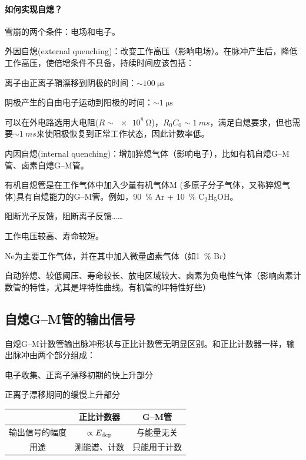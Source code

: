 \paragraph{如何实现自熄？}雪崩的两个条件：电场和电子。

外因自熄(external quenching)：改变工作高压（影响电场）。在脉冲产生后，降低工作高压，使倍增条件不具备，持续时间应该包括：
\begin{compactitem}
	\item 离子由正离子鞘漂移到阴极的时间：$\sim \qty{100}{\micro\second}$
	\item 阴极产生的自由电子运动到阳极的时间：$\sim \qty{1}{\micro\second}$
\end{compactitem}
可以在外电路选用大电阻($R \sim \qty{e8}{\ohm}$)，$R_0C_0 \sim \qty{1}{ms}$，满足自熄要求，但也需要$\sim \qty{1}{ms}$来使阳极恢复到正常工作状态，因此计数率低。

内因自熄(internal quenching)：增加猝熄气体（影响电子），比如有机自熄G--M管、卤素自熄G--M管。


有机自熄管是在工作气体中加入少量有机气体M (多原子分子气体，又称猝熄气体)具有自熄能力的G--M管。例如，\qty{90}{\percent} Ar + \qty{10}{\percent} C$_2$H$_5$OH。

阻断光子反馈，阻断离子反馈……

工作电压较高、寿命较短。


Ne为主要工作气体，并在其中加入微量卤素气体（如\qty{1}{\percent} Br）

自动猝熄、较低阈压、寿命较长、放电区域较大、卤素为负电性气体（影响卤素计数管的特性，尤其是坪特性曲线。有机管的坪特性好些）

\subsection{自熄G--M管的输出信号}

自熄G--M计数管输出脉冲形状与正比计数管无明显区别。和正比计数器一样，输出脉冲由两个部分组成：
\begin{compactenum}
	\item 电子收集、正离子漂移初期的快上升部分
	\item 正离子漂移期间的缓慢上升部分
\end{compactenum}
\begin{notecaptionblock}
	\begin{tabular}{ccc}
		\toprule
		&正比计数器&G--M管\\
		\midrule
		输出信号的幅度&$\propto E_{\mathrm{dep}}$&与能量无关\\
		用途&测能谱、计数&只能用于计数\\
		\bottomrule
	\end{tabular}
\end{notecaptionblock}

